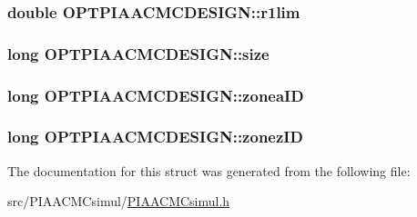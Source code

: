 \hypertarget{structOPTPIAACMCDESIGN_a4842ab89cd721c1c83af3d4b728ffcf6}{
\subsubsection[{r1lim}]{\setlength{\rightskip}{0pt plus 5cm}double O\+P\+T\+P\+I\+A\+A\+C\+M\+C\+D\+E\+S\+I\+G\+N\+::r1lim}}\label{structOPTPIAACMCDESIGN_a4842ab89cd721c1c83af3d4b728ffcf6}
\hypertarget{structOPTPIAACMCDESIGN_a9a77cc42ff9de1dbd1d484e7020da6eb}{
\subsubsection[{size}]{\setlength{\rightskip}{0pt plus 5cm}long O\+P\+T\+P\+I\+A\+A\+C\+M\+C\+D\+E\+S\+I\+G\+N\+::size}}\label{structOPTPIAACMCDESIGN_a9a77cc42ff9de1dbd1d484e7020da6eb}
\hypertarget{structOPTPIAACMCDESIGN_afdfb76344ee9a82f3a5790fcb602ade6}{
\subsubsection[{zonea\+I\+D}]{\setlength{\rightskip}{0pt plus 5cm}long O\+P\+T\+P\+I\+A\+A\+C\+M\+C\+D\+E\+S\+I\+G\+N\+::zonea\+I\+D}}\label{structOPTPIAACMCDESIGN_afdfb76344ee9a82f3a5790fcb602ade6}
\hypertarget{structOPTPIAACMCDESIGN_a46c2ef78ec06d39b947a793d0a03dc28}{
\subsubsection[{zonez\+I\+D}]{\setlength{\rightskip}{0pt plus 5cm}long O\+P\+T\+P\+I\+A\+A\+C\+M\+C\+D\+E\+S\+I\+G\+N\+::zonez\+I\+D}}\label{structOPTPIAACMCDESIGN_a46c2ef78ec06d39b947a793d0a03dc28}


The documentation for this struct was generated from the following file\+:\begin{DoxyCompactItemize}
\item 
src/\+P\+I\+A\+A\+C\+M\+Csimul/\hyperlink{PIAACMCsimul_8h}{P\+I\+A\+A\+C\+M\+Csimul.\+h}\end{DoxyCompactItemize}
